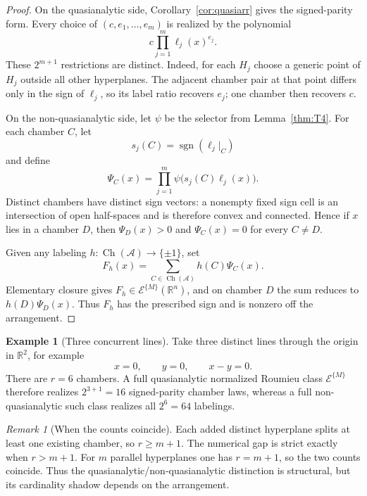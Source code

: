 \documentclass[11pt]{article}
\theoremstyle{definition}
\newtheorem{example}[theorem]{Example}
\theoremstyle{remark}
\newtheorem{remark}[theorem]{Remark}
\newcommand{\R}{\mathbb{R}}
\newcommand{\sign}{\operatorname{sgn}}
\newcommand{\Ch}{\operatorname{Ch}}
\newcommand{\cA}{\mathcal{A}}
\begin{document}
\begin{proof}
On the quasianalytic side, Corollary~\ref{cor:quasiarr} gives the signed-parity form. Every choice of $(c,e_1,\dots,e_m)$ is realized by the polynomial
\[
 c\prod_{j=1}^m\ell_j(x)^{e_j}.
\]
These $2^{m+1}$ restrictions are distinct. Indeed, for each $H_j$ choose a generic point of $H_j$ outside all other hyperplanes. The adjacent chamber pair at that point differs only in the sign of $\ell_j$, so its label ratio recovers $e_j$; one chamber then recovers $c$.

On the non-quasianalytic side, let $\psi$ be the selector from Lemma~\ref{thm:T4}. For each chamber $C$, let
\[
 s_j(C)=\sign(\ell_j|_C)
\]
and define
\[
 \Psi_C(x)=\prod_{j=1}^m\psi\bigl(s_j(C)\ell_j(x)\bigr).
\]
Distinct chambers have distinct sign vectors: a nonempty fixed sign cell is an intersection of open half-spaces and is therefore convex and connected. Hence if $x$ lies in a chamber $D$, then $\Psi_D(x)>0$ and $\Psi_C(x)=0$ for every $C\ne D$.

Given any labeling $h:\Ch(\cA)\to\{\pm1\}$, set
\[
 F_h(x)=\sum_{C\in\Ch(\cA)} h(C)\Psi_C(x).
\]
Elementary closure gives $F_h\in\mathcal{E}^{\{M\}}(\R^n)$, and on chamber $D$ the sum reduces to $h(D)\Psi_D(x)$. Thus $F_h$ has the prescribed sign and is nonzero off the arrangement.
\end{proof}

\begin{example}[Three concurrent lines]
Take three distinct lines through the origin in $\R^2$, for example
\[
 x=0,\qquad y=0,\qquad x-y=0.
\]
There are $r=6$ chambers. A full quasianalytic normalized Roumieu class $\mathcal{E}^{\{M\}}$ therefore realizes $2^{3+1}=16$ signed-parity chamber laws, whereas a full non-quasianalytic such class realizes all $2^6=64$ labelings.
\end{example}

\begin{remark}[When the counts coincide]
Each added distinct hyperplane splits at least one existing chamber, so $r\ge m+1$. The numerical gap is strict exactly when $r>m+1$. For $m$ parallel hyperplanes one has $r=m+1$, so the two counts coincide. Thus the quasianalytic/non-quasianalytic distinction is structural, but its cardinality shadow depends on the arrangement.
\end{remark}
\end{document}
